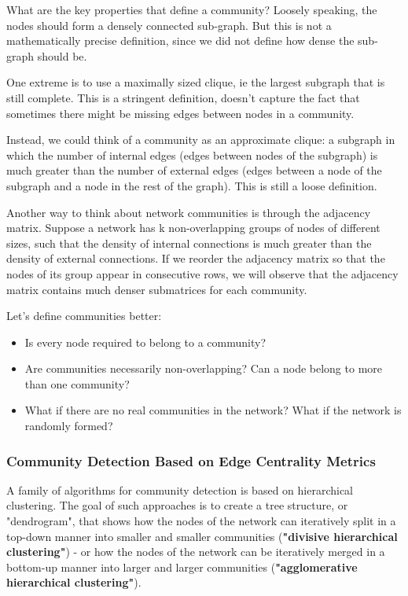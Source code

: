 \documentclass[11pt]{scrartcl} %
\begin{document}
What are the key properties that define a community? Loosely speaking, the nodes should form a densely connected sub-graph. But this is not a mathematically precise definition, since we did not define how dense the sub-graph should be.

One extreme is to use a maximally sized clique, ie the largest subgraph that is still complete. This is a stringent definition, doesn't capture the fact that sometimes there might be missing edges between nodes in a community.

Instead, we could think of a community as an approximate clique: a subgraph in which the number of internal edges (edges between nodes of the subgraph) is much greater than the number of external edges (edges between a node of the subgraph and a node in the rest of the graph). This is still a loose definition.

Another way to think about network communities is through the adjacency matrix. Suppose a network has k non-overlapping groups of nodes of different sizes, such that the density of internal connections is much greater than the density of external connections. If we reorder the adjacency matrix so that the nodes of its group appear in consecutive rows, we will observe that the adjacency matrix contains much denser submatrices for each community.

Let's define communities better:
\begin{itemize}
	\item Is every node required to belong to a community?
	\item Are communities necessarily non-overlapping? Can a node belong to more than one community?
	\item What if there are no real communities in the network? What if the network is randomly formed?
\end{itemize}

\subsubsection{Community Detection Based on Edge Centrality Metrics}
A family of algorithms for community detection is based on hierarchical clustering. The goal of such approaches is to create a tree structure, or "dendrogram", that shows how the nodes of the network can iteratively split in a top-down manner into smaller and smaller communities (\textbf{"divisive hierarchical clustering"}) - or how the nodes of the network can be iteratively merged in a bottom-up manner into larger and larger communities (\textbf{"agglomerative hierarchical clustering"}).
\end{document}
